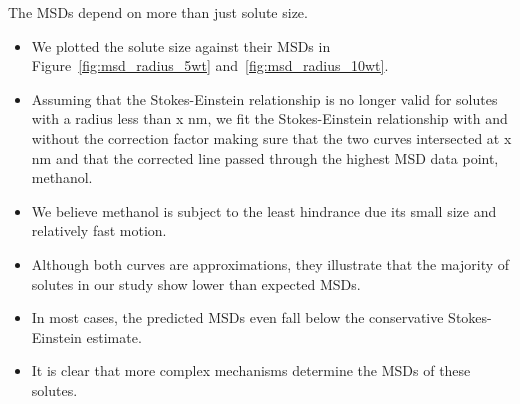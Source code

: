 \documentclass{article}
\begin{document}
  \noindent The MSDs depend on more than just solute size.
  \begin{itemize}
  	\item We plotted the solute size against their MSDs in Figure~\ref{fig:msd_radius_5wt}
  	and~\ref{fig:msd_radius_10wt}.
  	\item Assuming that the Stokes-Einstein relationship is no longer valid 
  	for solutes with a radius less than x nm, we fit the Stokes-Einstein relationship 
  	with and without the correction factor making sure that the two curves intersected
  	at x nm and that the corrected line passed through the highest MSD data point, methanol. %
  	\item We believe methanol is subject to the least hindrance due its small
  	size and relatively fast motion.
  	\item Although both curves are approximations, they illustrate that
  	the majority of solutes in our study show lower than expected MSDs. 
  	\item In most cases, the predicted MSDs even fall below the 
  	conservative Stokes-Einstein estimate.
  	\item It is clear that more complex mechanisms determine the MSDs of
  	these solutes.

\end{itemize}
\end{document}
